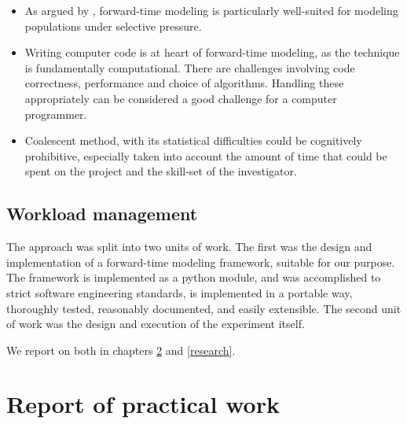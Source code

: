 \documentclass{l4proj}
\begin{document}
\begin{itemize}
\item As argued by \cite{peng10}, forward-time modeling is particularly well-suited for modeling populations under selective pressure.
\item Writing computer code is at heart of forward-time modeling, as the technique is fundamentally computational. There are challenges involving code correctness, performance and choice of algorithms. Handling these appropriately can be considered a good challenge for a computer programmer.  
\item Coalescent method, with its statistical difficulties could be cognitively prohibitive, especially taken into account the amount of time that could be spent on the project and the skill-set of the investigator.  
\end{itemize}

\section{Workload management}

The approach was split into two units of work. The first was the design and implementation of a forward-time modeling framework, suitable for our purpose. The framework is implemented as a python module, and was accomplished to strict software engineering standards, is implemented in a portable way, thoroughly tested, reasonably documented, and easily extensible. The second unit of work was the design and execution of the experiment itself.

We report on both in chapters \ref{practical} and \ref{research}.



\chapter{Report of practical work}\label{practical}
\end{document}
